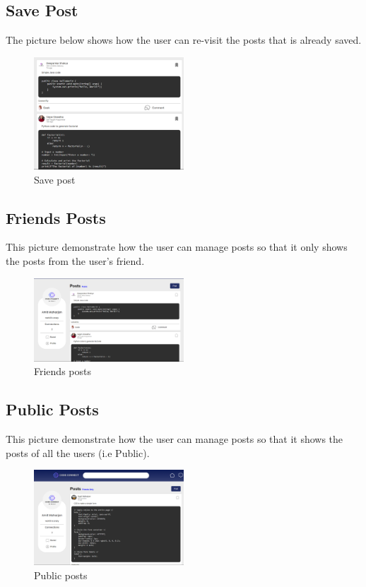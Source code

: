 \subsection{Save Post}
The picture below shows how the user can re-visit the posts that is already saved.
\begin{figure}[ht]
    \centering
    \includegraphics[width=0.5\textwidth]{Outcome-ss/saved-posts-list.png}
    \caption{Save post}
    \label{fig:Save Post}
\end{figure}

\subsection{Friends Posts}
This picture demonstrate how the user can manage posts so that it only shows the posts from the user's friend.
\begin{figure}[H]
    \centering
    \includegraphics[width=0.5\textwidth]{Outcome-ss/friends-posts.png}
    \caption{Friends posts}
    \label{fig:Friends posts}
\end{figure}

\subsection{Public Posts}
This picture demonstrate how the user can manage posts so that it shows the posts of all the users (i.e Public).
\begin{figure}[H]
    \centering
    \includegraphics[width=0.5\textwidth]{Outcome-ss/public-posts.png}
    \caption{Public posts}
    \label{fig:Public posts}
\end{figure}
